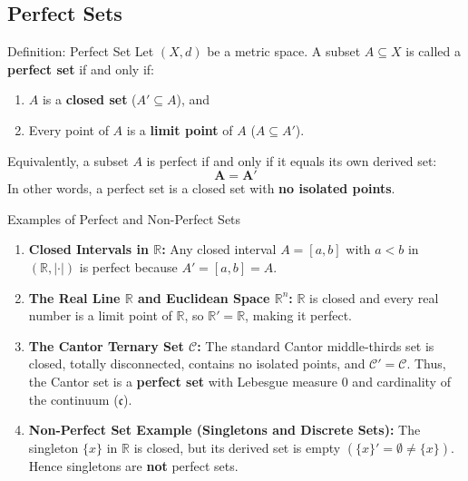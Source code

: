 \documentclass[11pt,a4paper]{article}
\begin{document}
\newpage

\subsection{Perfect Sets}

\begin{defbox}{Definition: Perfect Set}
Let $(X, d)$ be a metric space. A subset $A \subseteq X$ is called a \textbf{perfect set} if and only if:
\begin{enumerate}
    \item $A$ is a \textbf{closed set} ($A' \subseteq A$), and
    \item Every point of $A$ is a \textbf{limit point} of $A$ ($A \subseteq A'$).
\end{enumerate}
Equivalently, a subset $A$ is perfect if and only if it equals its own derived set:
\begin{equation}
    \mathbf{A = A'}
\end{equation}
In other words, a perfect set is a closed set with \textbf{no isolated points}.
\end{defbox}

\begin{exbox}{Examples of Perfect and Non-Perfect Sets}
\begin{enumerate}
    \item \textbf{Closed Intervals in $\mathbb{R}$:}
    Any closed interval $A = [a, b]$ with $a < b$ in $(\mathbb{R}, |\cdot|)$ is perfect because $A' = [a, b] = A$.
    
    \item \textbf{The Real Line $\mathbb{R}$ and Euclidean Space $\mathbb{R}^n$:}
    $\mathbb{R}$ is closed and every real number is a limit point of $\mathbb{R}$, so $\mathbb{R}' = \mathbb{R}$, making it perfect.
    
    \item \textbf{The Cantor Ternary Set $\mathcal{C}$:}
    The standard Cantor middle-thirds set is closed, totally disconnected, contains no isolated points, and $\mathcal{C}' = \mathcal{C}$. Thus, the Cantor set is a \textbf{perfect set} with Lebesgue measure $0$ and cardinality of the continuum ($\mathfrak{c}$).
    
    \item \textbf{Non-Perfect Set Example (Singletons and Discrete Sets):}
    The singleton $\{x\}$ in $\mathbb{R}$ is closed, but its derived set is empty $(\{x\}' = \emptyset \neq \{x\})$. Hence singletons are \textbf{not} perfect sets.
\end{enumerate}
\end{exbox}
\end{document}
